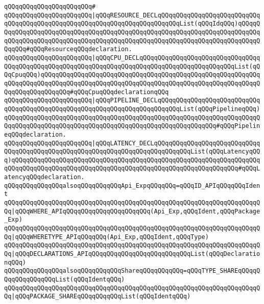\verb|qQQqqQQqqQQqqQQqqQQqqQQq#|\newline
\verb|qQQqqQQqqQQqqQQqqQQqqQQq|\verb#|qQQqRESOURCE_DECLqQQqqQQqqQQqqQQqqQQqqQQqqQQqqQQqqQQqqQQqqQQqqQQqqQQqqQQqqQQqqQQqqQQqqQQqqQQqList(qQQqIdqQQq)qQQqqQQqqQQqqQQqqQQqqQQqqQQqqQQqqQQqqQQqqQQqqQQqqQQqqQQqqQQqqQQqqQQqqQQqqQQqqQQqqQQqqQQqqQQqqQQqqQQqqQQqqQQqqQQqqQQqqQQqqQQqqQQqqQQqqQQqqQQqqQQqqQQqqQQq#\verb|#qQQqResourceqQQqdeclaration.|\newline
\verb|qQQqqQQqqQQqqQQqqQQqqQQq|\verb#|qQQqCPU_DECLqQQqqQQqqQQqqQQqqQQqqQQqqQQqqQQqqQQqqQQqqQQqqQQqqQQqqQQqqQQqqQQqqQQqqQQqqQQqqQQqqQQqqQQqqQQqqQQqList(qQQqCpuqQQq)qQQqqQQqqQQqqQQqqQQqqQQqqQQqqQQqqQQqqQQqqQQqqQQqqQQqqQQqqQQqqQQqqQQqqQQqqQQqqQQqqQQqqQQqqQQqqQQqqQQqqQQqqQQqqQQqqQQqqQQqqQQqqQQqqQQqqQQqqQQqqQQqqQQq#\verb|#qQQqCpuqQQqdeclarationqQQq|\newline
\verb|qQQqqQQqqQQqqQQqqQQqqQQq|\verb#|qQQqPIPELINE_DECLqQQqqQQqqQQqqQQqqQQqqQQqqQQqqQQqqQQqqQQqqQQqqQQqqQQqqQQqqQQqqQQqqQQqqQQqqQQqList(qQQqPipelineqQQq)qQQqqQQqqQQqqQQqqQQqqQQqqQQqqQQqqQQqqQQqqQQqqQQqqQQqqQQqqQQqqQQqqQQqqQQqqQQqqQQqqQQqqQQqqQQqqQQqqQQqqQQqqQQqqQQqqQQqqQQqqQQqqQQq#\verb|#qQQqPipelineqQQqdeclaration.|\newline
\verb|qQQqqQQqqQQqqQQqqQQqqQQq|\verb#|qQQqLATENCY_DECLqQQqqQQqqQQqqQQqqQQqqQQqqQQqqQQqqQQqqQQqqQQqqQQqqQQqqQQqqQQqqQQqqQQqqQQqqQQqqQQqList(qQQqLatencyqQQq)qQQqqQQqqQQqqQQqqQQqqQQqqQQqqQQqqQQqqQQqqQQqqQQqqQQqqQQqqQQqqQQqqQQqqQQqqQQqqQQqqQQqqQQqqQQqqQQqqQQqqQQqqQQqqQQqqQQqqQQqqQQqqQQqqQQq#\verb|#qQQqLatencyqQQqdeclaration.|\newline
\newline
\verb|qQQqqQQqqQQqqQQqalsoqQQqqQQqqQQqApi_ExpqQQqqQQq=qQQqID_APIqQQqqQQqIdent|\newline
\verb|qQQqqQQqqQQqqQQqqQQqqQQqqQQqqQQqqQQqqQQqqQQqqQQqqQQqqQQqqQQqqQQqqQQqqQQq|\verb#|qQQqWHERE_APIqQQqqQQqqQQqqQQqqQQqqQQq(Api_Exp,qQQqIdent,qQQqPackage_Exp)#\newline
\verb|qQQqqQQqqQQqqQQqqQQqqQQqqQQqqQQqqQQqqQQqqQQqqQQqqQQqqQQqqQQqqQQqqQQqqQQq|\verb#|qQQqWHERETYPE_APIqQQqqQQq(Api_Exp,qQQqIdent,qQQqType)#\newline
\verb|qQQqqQQqqQQqqQQqqQQqqQQqqQQqqQQqqQQqqQQqqQQqqQQqqQQqqQQqqQQqqQQqqQQqqQQq|\verb#|qQQqDECLARATIONS_APIqQQqqQQqqQQqqQQqqQQqqQQqqQQqList(qQQqDeclarationqQQq)#\newline
\newline
\verb|qQQqqQQqqQQqqQQqalsoqQQqqQQqqQQqShareqQQqqQQqqQQq=qQQqTYPE_SHAREqQQqqQQqqQQqqQQqqQQqList(qQQqIdentqQQq)|\newline
\verb|qQQqqQQqqQQqqQQqqQQqqQQqqQQqqQQqqQQqqQQqqQQqqQQqqQQqqQQqqQQqqQQqqQQqqQQq|\verb#|qQQqPACKAGE_SHAREqQQqqQQqqQQqList(qQQqIdentqQQq)#\newline
